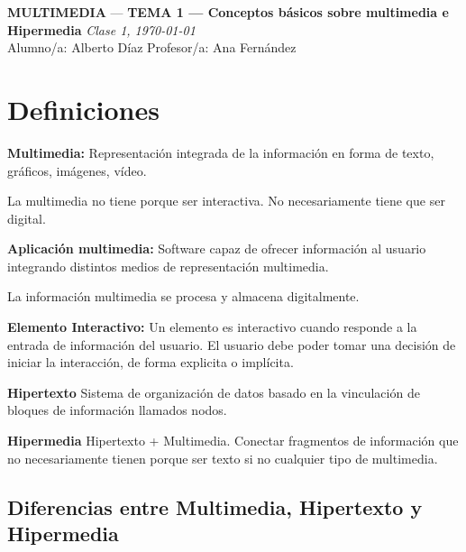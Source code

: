 \documentclass[11pt,a4paper]{article}
\newcommand{\asignatura}{MULTIMEDIA}
\newcommand{\tema}{TEMA 1 — Conceptos básicos sobre multimedia e Hipermedia}  %
\newcommand{\clase}{Clase 1}
\newcommand{\fecha}{\today}                              %
\begin{document}
	
	{\large \textbf{\asignatura} \;—\; \textbf{\tema} \hfill \textit{\clase, \fecha}}\\[0.4em]
	\faUser\; Alumno/a: Alberto Díaz\hfill
	\faChalkboardTeacher\; Profesor/a: Ana Fernández
	
	\vspace{0.6em}
	
	\tableofcontents
	
	\section{Definiciones}
	\begin{DefBox}
		\textbf{Multimedia:} Representación integrada de la información en forma de texto, gráficos, imágenes, vídeo.
		
		La multimedia no tiene porque ser interactiva. No necesariamente tiene que ser digital.
	\end{DefBox}
	
	
	
	\begin{DefBox}
		\textbf{Aplicación multimedia:} Software capaz de ofrecer información al usuario integrando distintos medios de representación multimedia.
		
		La información multimedia se procesa y almacena digitalmente.
	\end{DefBox}
	
	\begin{DefBox}
		\textbf{Elemento Interactivo: } Un elemento es interactivo cuando responde a la entrada de información del usuario. El usuario debe poder tomar una decisión de iniciar la interacción, de forma explicita o implícita.
	\end{DefBox}
	
	\begin{DefBox}
		\textbf{Hipertexto} Sistema de organización de datos basado en la vinculación de bloques de información llamados nodos.
	\end{DefBox}
	
	\begin{DefBox}
		\textbf{Hipermedia} Hipertexto + Multimedia. Conectar fragmentos de información que no necesariamente tienen porque ser texto si no cualquier tipo de multimedia.
	\end{DefBox}
	
	\subsection{Diferencias entre Multimedia, Hipertexto y Hipermedia}
\end{document}
